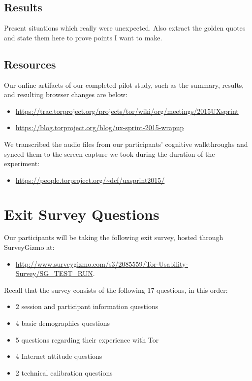 \documentclass[letterpaper,twocolumn,11pt]{article}
\begin{document}
\subsection{Results}
{\color {red} Present situations which really were unexpected. 
Also extract the golden quotes and state them here 
to prove points I want to make. }

\subsection{Resources}

\indent \indent  Our online artifacts of our completed pilot study, such as 
the summary, results, and resulting browser changes are below:
\begin{itemize} \itemsep1pt \parskip0pt 
\item \url{https://trac.torproject.org/projects/tor/wiki/org/meetings/2015UXsprint}
\item \url{https://blog.torproject.org/blog/ux-sprint-2015-wrapup}
\end{itemize}

\noindent We transcribed the audio files from our participants' cognitive walkthroughs
and synced them to the screen capture we took during the duration of the experiment:
\begin{itemize} \itemsep1pt \parskip0pt 
\item \url{https://people.torproject.org/~dcf/uxsprint2015/}
\end{itemize}

\section{Exit Survey Questions}
\label{sec:survey} 
\indent \indent Our participants will be taking the following exit survey, hosted through
SurveyGizmo at: 
\begin{itemize} \itemsep1pt \parskip0pt 
\item \url{http://www.surveygizmo.com/s3/2085559/Tor-Usability-Survey/SG_TEST_RUN}.
\end{itemize}

\noindent Recall that the survey consists of the following 17 questions, in this order: 
\begin{itemize} \itemsep1pt \parskip0pt 
\item 2 session and participant information questions
\item 4 basic demographics questions
\item 5 questions regarding their experience with Tor
\item 4 Internet attitude questions
\item 2 technical calibration questions
\end{itemize}
\end{document}
